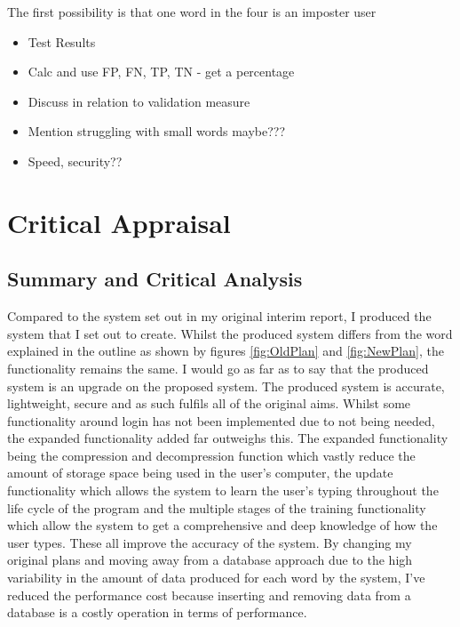 \documentclass[10pt,a4paper]{report}
\begin{document}
The first possibility is that one word in the four is an imposter user




\begin{itemize}
	\item Test Results
	\item Calc and use FP, FN, TP, TN - get a percentage
	\item Discuss in relation to validation measure
	\item Mention struggling with small words maybe???
	\item Speed, security??
\end{itemize}


\chapter{Critical Appraisal}




\section{Summary and Critical Analysis}

Compared to the system set out in my original interim report, I produced the system that I set out to create. Whilst the produced system differs from the word explained in the outline as shown by figures \ref{fig:OldPlan} and \ref{fig:NewPlan}, the functionality remains the same. I would go as far as to say that the produced system is an upgrade on the proposed system. The produced system is accurate, lightweight, secure and as such fulfils all of the original aims. Whilst some functionality around login has not been implemented due to not being needed, the expanded functionality added far outweighs this. The expanded functionality being the compression and decompression function which vastly reduce the amount of storage space being used in the user's computer, the update functionality which allows the system to learn the user's typing throughout the life cycle of the program and the multiple stages of the training functionality which allow the system to get a comprehensive and deep knowledge of how the user types. These all improve the accuracy of the system. By changing my original plans and moving away from a database approach due to the high variability in the amount of data produced for each word by the system, I've reduced the performance cost because inserting and removing data from a database is a costly operation in terms of performance.
\end{document}
